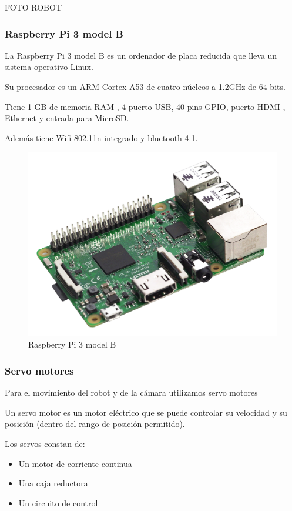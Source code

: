 \documentclass[twoside, 12pt]{epstfg}
\begin{document}
FOTO ROBOT

\subsubsection{Raspberry Pi 3 model B}

La Raspberry Pi 3 model B es un ordenador de placa reducida que lleva un sistema operativo Linux.

Su procesador es un ARM Cortex A53 de cuatro núcleos a 1.2GHz de 64 bits.

Tiene 1 GB de memoria RAM , 4 puerto USB, 40 pins GPIO, puerto HDMI , Ethernet y entrada para MicroSD.

Además tiene Wifi 802.11n integrado y bluetooth 4.1.


\begin{figure}[h]
	\centerline{
		\mbox{\includegraphics[width=.80\textwidth]{images/raspi3.jpg}}
	}
	\caption{Raspberry Pi 3 model B}
	
\end{figure}

\subsubsection{Servo motores}
Para el movimiento del robot y de la cámara utilizamos servo motores


Un servo motor es un motor eléctrico que se puede controlar su velocidad y su posición (dentro del rango de posición permitido).

Los servos constan de:
\begin{itemize}
	\item Un motor de corriente continua
	\item Una caja reductora
	\item Un circuito de control
\end{itemize}
\end{document}
